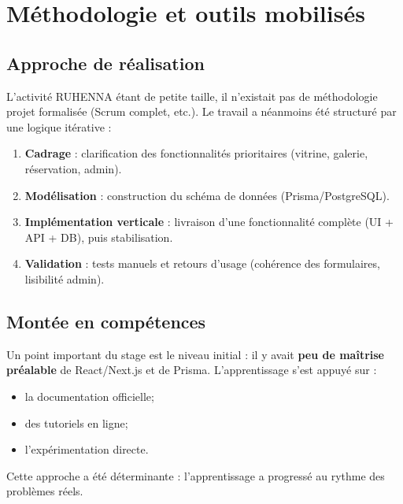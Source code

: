 \section{Méthodologie et outils mobilisés}

\subsection{Approche de réalisation}
L’activité RUHENNA étant de petite taille, il n’existait pas de méthodologie projet formalisée (Scrum complet, etc.). Le travail a néanmoins été structuré par une logique itérative :
\begin{enumerate}
    \item \textbf{Cadrage} : clarification des fonctionnalités prioritaires (vitrine, galerie, réservation, admin).
    \item \textbf{Modélisation} : construction du schéma de données (Prisma/PostgreSQL).
    \item \textbf{Implémentation verticale} : livraison d’une fonctionnalité complète (UI + API + DB), puis stabilisation.
    \item \textbf{Validation} : tests manuels et retours d’usage (cohérence des formulaires, lisibilité admin).
\end{enumerate}

\subsection{Montée en compétences}
Un point important du stage est le niveau initial : il y avait \textbf{peu de maîtrise préalable} de React/Next.js et de Prisma. L’apprentissage s’est appuyé sur :
\begin{itemize}
    \item la documentation officielle;
    \item des tutoriels en ligne;
    \item l’expérimentation directe.
\end{itemize}
Cette approche a été déterminante : l’apprentissage a progressé au rythme des problèmes réels.

